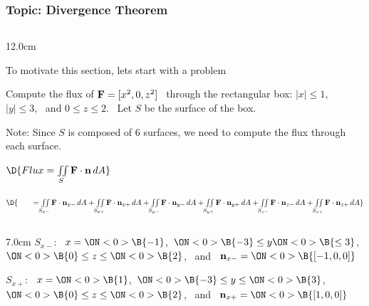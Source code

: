 \begin{frame}
\frametitle{Topic: Divergence Theorem}
\begin{columns}\begin{column}{12.0cm}

\scriptsize

\vspace{0.2cm}

To motivate this section, lets start with a problem

\vspace{0.2cm}

Compute the flux of ${\bf F} = [x^2,0,z^2]$ \, through the rectangular box: $|x| \le 1$, \, $|y| \le 3$, \, and $0 \le z \le 2$. \, Let $S$ be the surface of the box.

\vspace{0.2cm}

Note: Since $S$ is composed of 6 surfaces, we need to compute the flux through each surface.


\vspace{0.2cm}
 
$\D{Flux = \iint \limits_{S} {\bf F} \cdot {\bf n}\, dA}$

$\D{ \qquad = \iint \limits_{S_{x-}} {\bf F} \cdot {\bf n}_{x-}\, dA + \iint \limits_{S_{x+}} {\bf F} \cdot {\bf n}_{x+}\, dA + \iint \limits_{S_{y-}} {\bf F} \cdot {\bf n}_{y-}\, dA + \iint \limits_{S_{y+}} {\bf F} \cdot {\bf n}_{y+}\, dA + \iint \limits_{S_{z-}} {\bf F} \cdot {\bf n}_{z-}\, dA + \iint \limits_{S_{z+}} {\bf F} \cdot {\bf n}_{z+}\, dA}$

\vspace{0.2cm}

\begin{columns}
\begin{column}{7.0cm}
	$S_{x-}$: \, 
	$x=\ON<0>{\B{-1}}$,\, 
	$\ON<0>{\B{-3}} \le y 
	\ON<0>{\B{\le 3}}$,\, 
	$\ON<0>{\B{0}} \le z \le 
	\ON<0>{\B{2}}$, \, and \, ${\bf n}_{x-} = 
	\ON<0>{\B{[-1,0,0]}}$
	
	\vspace{0.4cm}
	
	$S_{x+}$: \, 
	$x=\ON<0>{\B{1}}$,\, 
	$\ON<0>{\B{-3}} \le y \le 
	\ON<0>{\B{3}}$,\, 
	$\ON<0>{\B{0}} \le z \le 
	\ON<0>{\B{2}}$, \, and \, ${\bf n}_{x+} = 
	\ON<0>{\B{[1,0,0]}}$
	
	\vspace{0.4cm}
	

\end{column}
\end{columns}
\end{column}
\end{columns}
\end{frame}
